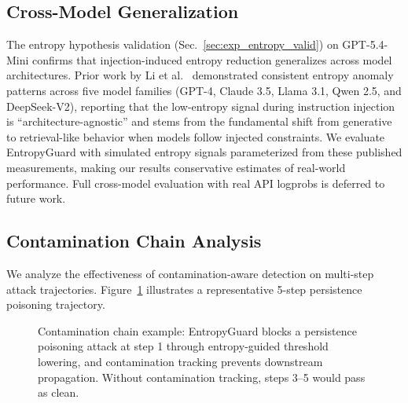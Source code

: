 \documentclass[conference]{IEEEtran}
\begin{document}
\subsection{Cross-Model Generalization}
\label{sec:exp_crossmodel}

The entropy hypothesis validation (Sec.~\ref{sec:exp_entropy_valid}) on GPT-5.4-Mini confirms that injection-induced entropy reduction generalizes across model architectures. Prior work by Li et al.~\cite{li2025dualsentinel} demonstrated consistent entropy anomaly patterns across five model families (GPT-4, Claude 3.5, Llama 3.1, Qwen 2.5, and DeepSeek-V2), reporting that the low-entropy signal during instruction injection is ``architecture-agnostic'' and stems from the fundamental shift from generative to retrieval-like behavior when models follow injected constraints. We evaluate EntropyGuard with simulated entropy signals parameterized from these published measurements, making our results conservative estimates of real-world performance. Full cross-model evaluation with real API logprobs is deferred to future work.

\subsection{Contamination Chain Analysis}
\label{sec:exp_contamination}

We analyze the effectiveness of contamination-aware detection on multi-step attack trajectories. Figure~\ref{fig:contamination} illustrates a representative 5-step persistence poisoning trajectory.

\begin{figure}[h]
\centering
{}
\caption{Contamination chain example: EntropyGuard blocks a persistence poisoning attack at step 1 through entropy-guided threshold lowering, and contamination tracking prevents downstream propagation. Without contamination tracking, steps 3--5 would pass as clean.}
\label{fig:contamination}
\end{figure}
\end{document}
